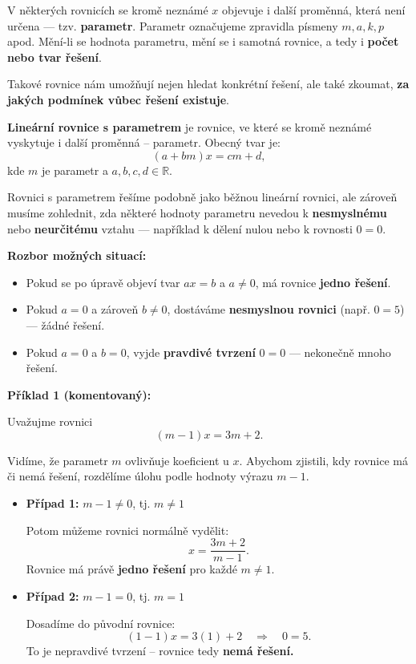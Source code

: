\documentclass[12pt,a4paper]{article}
\begin{document}
V některých rovnicích se kromě neznámé \(x\) objevuje i další proměnná,  
která není určena — tzv. \textbf{parametr}.  
Parametr označujeme zpravidla písmeny \(m, a, k, p\) apod.  
Mění-li se hodnota parametru, mění se i samotná rovnice,  
a tedy i \textbf{počet nebo tvar řešení}.  

\medskip
Takové rovnice nám umožňují nejen hledat konkrétní řešení,  
ale také zkoumat, \textbf{za jakých podmínek vůbec řešení existuje}.  

\begin{definitionbox}
\textbf{Lineární rovnice s parametrem} je rovnice, ve které se kromě neznámé vyskytuje i další proměnná – parametr.  
Obecný tvar je:
\[
(a + b m)x = c m + d,
\]
kde \(m\) je parametr a \(a, b, c, d \in \mathbb{R}\).
\end{definitionbox}


Rovnici s parametrem řešíme podobně jako běžnou lineární rovnici,  
ale zároveň musíme zohlednit, zda některé hodnoty parametru nevedou k \textbf{nesmyslnému} nebo \textbf{neurčitému} vztahu —  
například k dělení nulou nebo k rovnosti \(0 = 0\).  

\textbf{Rozbor možných situací:}
\begin{itemize}
  \item Pokud se po úpravě objeví tvar \(a x = b\) a \(a \neq 0\),  
        má rovnice \textbf{jedno řešení}.
  \item Pokud \(a = 0\) a zároveň \(b \neq 0\),  
        dostáváme \textbf{nesmyslnou rovnici} (např. \(0 = 5\)) — žádné řešení.
  \item Pokud \(a = 0\) a \(b = 0\),  
        vyjde \textbf{pravdivé tvrzení} \(0 = 0\) — nekonečně mnoho řešení.
\end{itemize}


\textbf{Příklad 1 (komentovaný):}

Uvažujme rovnici
\[
(m - 1)x = 3m + 2.
\]

Vidíme, že parametr \(m\) ovlivňuje koeficient u \(x\).  
Abychom zjistili, kdy rovnice má či nemá řešení,  
rozdělíme úlohu podle hodnoty výrazu \(m - 1\).

\begin{itemize}
  \item \textbf{Případ 1:} \(m - 1 \neq 0\), tj. \(m \neq 1\)

  Potom můžeme rovnici normálně vydělit:
  \[
  x = \frac{3m + 2}{m - 1}.
  \]
  Rovnice má právě \textbf{jedno řešení} pro každé \(m \neq 1\).

  \item \textbf{Případ 2:} \(m - 1 = 0\), tj. \(m = 1\)

  Dosadíme do původní rovnice:
  \[
  (1 - 1)x = 3(1) + 2 \quad \Rightarrow \quad 0 = 5.
  \]
  To je nepravdivé tvrzení – rovnice tedy \textbf{nemá řešení.}
\end{itemize}
\end{document}
